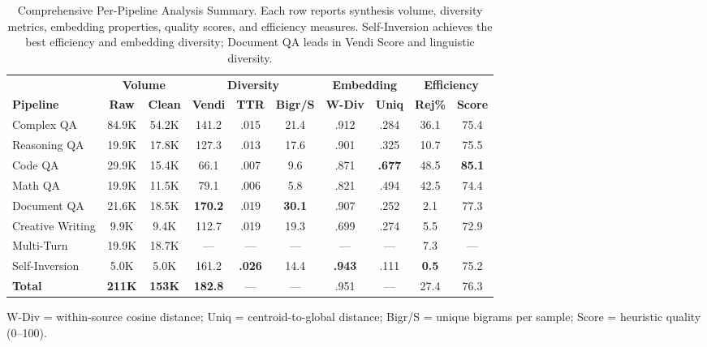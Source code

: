 \begin{table}[t]
\centering
\caption{Comprehensive Per-Pipeline Analysis Summary. Each row reports synthesis volume, diversity metrics, embedding properties, quality scores, and efficiency measures. Self-Inversion achieves the best efficiency and embedding diversity; Document QA leads in Vendi Score and linguistic diversity.}
\label{tab:comprehensive_pipeline}
\small
\begin{tabular}{l|cc|ccc|cc|cc}
\toprule
 & \multicolumn{2}{c|}{\textbf{Volume}} & \multicolumn{3}{c|}{\textbf{Diversity}} & \multicolumn{2}{c|}{\textbf{Embedding}} & \multicolumn{2}{c}{\textbf{Efficiency}} \\
\textbf{Pipeline} & \textbf{Raw} & \textbf{Clean} & \textbf{Vendi} & \textbf{TTR} & \textbf{Bigr/S} & \textbf{W-Div} & \textbf{Uniq} & \textbf{Rej\%} & \textbf{Score} \\
\midrule
Complex QA & 84.9K & 54.2K & 141.2 & .015 & 21.4 & .912 & .284 & 36.1 & 75.4 \\
Reasoning QA & 19.9K & 17.8K & 127.3 & .013 & 17.6 & .901 & .325 & 10.7 & 75.5 \\
Code QA & 29.9K & 15.4K & 66.1 & .007 & 9.6 & .871 & \textbf{.677} & 48.5 & \textbf{85.1} \\
Math QA & 19.9K & 11.5K & 79.1 & .006 & 5.8 & .821 & .494 & 42.5 & 74.4 \\
Document QA & 21.6K & 18.5K & \textbf{170.2} & .019 & \textbf{30.1} & .907 & .252 & 2.1 & 77.3 \\
Creative Writing & 9.9K & 9.4K & 112.7 & .019 & 19.3 & .699 & .274 & 5.5 & 72.9 \\
Multi-Turn & 19.9K & 18.7K & --- & --- & --- & --- & --- & 7.3 & --- \\
Self-Inversion & 5.0K & 5.0K & 161.2 & \textbf{.026} & 14.4 & \textbf{.943} & .111 & \textbf{0.5} & 75.2 \\
\midrule
\textbf{Total} & \textbf{211K} & \textbf{153K} & \textbf{182.8} & --- & --- & .951 & --- & 27.4 & 76.3 \\
\bottomrule
\end{tabular}
\vspace{1mm}
\begin{flushleft}
\footnotesize W-Div = within-source cosine distance; Uniq = centroid-to-global distance; Bigr/S = unique bigrams per sample; Score = heuristic quality (0--100).
\end{flushleft}
\vspace{-4mm}
\end{table}
